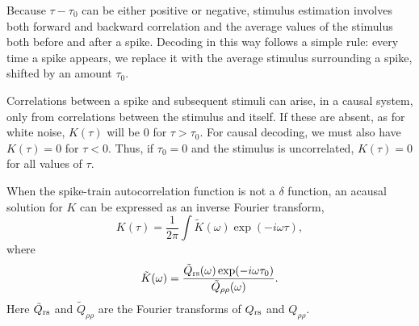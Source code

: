 \begin{rem}
   Because $\tau-\tau_{0}$ can be either positive or negative, stimulus
   estimation involves both forward and backward correlation and the
   average values of the stimulus both before and after a
   spike. Decoding in this way follows a simple rule: every time a
   spike appears, we replace it with the average stimulus surrounding a spike, shifted by an amount $\tau_{0}$.
\end{rem}

\begin{rem}
  Correlations between a spike and subsequent
stimuli can arise, in a causal system, only from correlations between the
stimulus and itself. If these are absent, as for white noise, $K(\tau)$ will be $0$
for $\tau>\tau_{0}$. For causal decoding, we must also have
$K(\tau)=0$ for $\tau<0$. Thus, if $\tau_0=0$ and the stimulus is uncorrelated, $K(\tau)=0$
for all values of $\tau$.
\end{rem}

\begin{prop}
When the spike-train autocorrelation function is not a $\delta$ function, an
acausal solution for $K$ can be expressed as an inverse Fourier transform,
\begin{equation}
  \label{eq:3.59}
  K(\tau)=\frac{1}{2\pi}\int{\tilde{K}(\omega)\exp(-i\omega\tau)},
\end{equation}
where
\begin{equation}
  \label{eq:3.60}
  \tilde{K}(\omega)=\frac{\tilde{Q}_{\rm{r}s}(\omega)\exp(-i\omega\tau_0)}{\tilde{Q}_{\rho\rho}(\omega)}.
\end{equation}
Here $\tilde{Q}_{\rm{r}s}$ and $\tilde{Q}_{\rho\rho}$ are the Fourier
transforms of ${Q}_{\rm{r}s}$ and ${Q}_{\rho\rho}$.
\end{prop}

